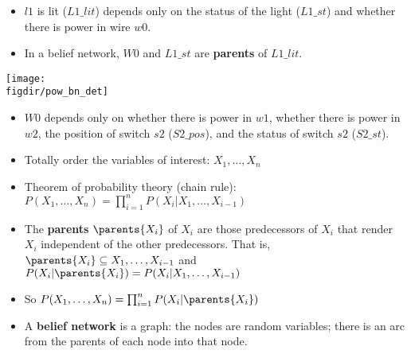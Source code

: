 \documentclass[12pt]{beamer} %
\newcommand{\figdir}{../../figures/ch06}
\begin{document}
\begin{slide}
\begin{minipage}[b]{0.5\textwidth}
\begin{itemize}
\item
 $l1$ is lit ($L1\_lit$) depends only on the status of the
light ($L1\_st$) and whether there is power in wire $w0$.
\item In a belief network, $W0$ and $L1\_st$ are \textbf{parents} of
  $L1\_lit$.
\end{itemize}
\end{minipage}%
\texttt{[image: \\figdir/pow\_bn\_det]}%

\begin{itemize}
\item $W0$ depends only on \pause whether there is power in $w1$,
whether there is power in $w2$, the position of switch $s2$
($S2\_pos$), and the status of switch $s2$ ($S2\_st$).
\end{itemize}

\end{slide}

\begin{slide}
\begin{itemize}
\item Totally order the variables of interest: $X_1,\dots,X_n$
\item Theorem of probability theory (chain rule):\\
$
P(X_1,\ldots,X_n) =\prod_{i=1}^n P(X_i|X_1,\dots,X_{i-1})
$
\item  The \textbf{parents} $\parents{X_i}$ of $X_i$ are those predecessors of $X_i$ that
render $X_i$ independent of the other predecessors. That is, \pause 
$\parents{X_i} \subseteq X_1,\dots,X_{i-1}$ and
$P(X_i|\parents{X_i}) = P(X_i|X_1,\dots,X_{i-1})$
\item So
$P(X_1,\ldots,X_n) = \prod_{i=1}^n P(X_i|\parents{X_i})$
\item A \textbf{belief network} is a graph: the nodes are random
variables; there is an arc from the parents of each node into that
node.
\end{itemize}
\end{slide}
\end{document}

